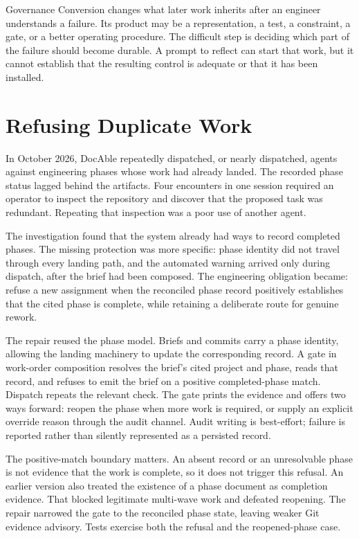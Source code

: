 
Governance Conversion changes what later work inherits after an engineer understands a failure. Its product may be a representation, a test, a constraint, a gate, or a better operating procedure. The difficult step is deciding which part of the failure should become durable. A prompt to reflect can start that work, but it cannot establish that the resulting control is adequate or that it has been installed.

\section{Refusing Duplicate Work}\label{heading:handbook-conversion-episode}

In October 2026, DocAble repeatedly dispatched, or nearly dispatched, agents against engineering phases whose work had already landed. The recorded phase status lagged behind the artifacts. Four encounters in one session required an operator to inspect the repository and discover that the proposed task was redundant. Repeating that inspection was a poor use of another agent.

The investigation found that the system already had ways to record completed phases. The missing protection was more specific: phase identity did not travel through every landing path, and the automated warning arrived only during dispatch, after the brief had been composed. The engineering obligation became: refuse a new assignment when the reconciled phase record positively establishes that the cited phase is complete, while retaining a deliberate route for genuine rework.

The repair reused the phase model. Briefs and commits carry a phase identity, allowing the landing machinery to update the corresponding record. A gate in work-order composition resolves the brief's cited project and phase, reads that record, and refuses to emit the brief on a positive completed-phase match. Dispatch repeats the relevant check. The gate prints the evidence and offers two ways forward: reopen the phase when more work is required, or supply an explicit override reason through the audit channel. Audit writing is best-effort; failure is reported rather than silently represented as a persisted record.

The positive-match boundary matters. An absent record or an unresolvable phase is not evidence that the work is complete, so it does not trigger this refusal. An earlier version also treated the existence of a phase document as completion evidence. That blocked legitimate multi-wave work and defeated reopening. The repair narrowed the gate to the reconciled phase state, leaving weaker Git evidence advisory. Tests exercise both the refusal and the reopened-phase case.

